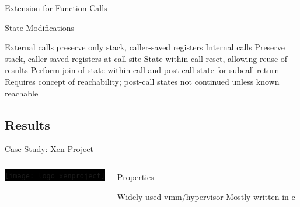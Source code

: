 \begin{frame}{Extension for Function Calls}
    \begin{block}{State Modifications}
      \begin{outline}
        \1<+-> External calls preserve only stack, \alert{caller-saved} registers
        \1<+-> Internal calls
          \2 Preserve stack, \alert{caller-saved} registers at call site
          \2 State within call reset, allowing reuse of results
          \2 Perform join of state-within-call and post-call state for subcall return
        \1<+-> Requires concept of \alert{reachability}; post-call states not continued unless known reachable
      \end{outline}
    \end{block}
%
\end{frame}


\subsection{Results}

\begin{frame}{Case Study: Xen Project}
  \begin{columns}
    \colorbox{black}{\texttt{[image: logo\_xenproject]}}

    \begin{block}{Properties}
      \begin{outline}
        \1 Widely used \gls{vmm}/hypervisor
        \1 Mostly written in \gls{c}
      \end{outline}
    \end{block}
  \end{columns}
\end{frame}

